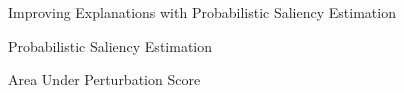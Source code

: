 \begin{frame}[standout]
	Improving Explanations with Probabilistic Saliency Estimation
\end{frame}

\begin{frame}{Probabilistic Saliency Estimation}

\end{frame}

\begin{frame}{Area Under Perturbation Score}

\end{frame}
